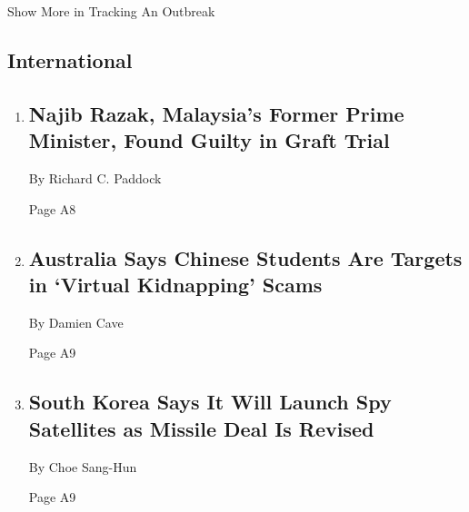 Show More in Tracking An Outbreak

\hypertarget{international}{%
\subsection{International}\label{international}}

\begin{enumerate}
\def\labelenumi{\arabic{enumi}.}
\item
  \href{/2020/07/28/world/asia/malaysia-1mdb-najib.html}{}

  \hypertarget{najib-razak-malaysias-former-prime-minister-found-guilty-in-graft-trial-1}{%
  \subsection{Najib Razak, Malaysia's Former Prime Minister, Found
  Guilty in Graft
  Trial}\label{najib-razak-malaysias-former-prime-minister-found-guilty-in-graft-trial-1}}

  By Richard C. Paddock

  Page A8
\item
  \href{/2020/07/28/world/australia/chinese-students-virtual-kidnapping.html}{}

  \hypertarget{australia-says-chinese-students-are-targets-in-virtual-kidnapping-scams}{%
  \subsection{Australia Says Chinese Students Are Targets in `Virtual
  Kidnapping'
  Scams}\label{australia-says-chinese-students-are-targets-in-virtual-kidnapping-scams}}

  By Damien Cave

  Page A9
\item
  \href{/2020/07/28/world/asia/south-korea-satellites-rockets.html}{}

  \hypertarget{south-korea-says-it-will-launch-spy-satellites-as-missile-deal-is-revised}{%
  \subsection{South Korea Says It Will Launch Spy Satellites as Missile
  Deal Is
  Revised}\label{south-korea-says-it-will-launch-spy-satellites-as-missile-deal-is-revised}}

  By Choe Sang-Hun

  Page A9
\end{enumerate}

